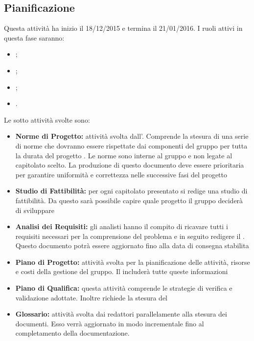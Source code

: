 \documentclass[12pt,a4paper]{article}
\begin{document}
\subsection{Pianificazione} %
Questa attività ha inizio il 18/12/2015 e termina il 21/01/2016. I ruoli attivi in questa fase saranno:
\begin{itemize}
	\item \PM;
	\item \AM;
	\item \AN;
	\item \VR.
\end{itemize}
Le sotto attività svolte sono:
\begin{itemize}
	\item \textbf{Norme di Progetto:} attività svolta dall’\AM. Comprende la stesura di una serie di norme che dovranno essere rispettate dai componenti del gruppo per tutta la durata del progetto \prjL. Le norme sono interne al gruppo e non legate al capitolato scelto. La produzione di questo documento deve essere prioritaria per garantire uniformità e correttezza nelle successive fasi del progetto
	\item \textbf{Studio di Fattibilità:} per ogni capitolato presentato si redige una studio di fattibilità. Da questo sarà possibile capire quale progetto il gruppo deciderà di sviluppare
	\item \textbf{Analisi dei Requisiti:} gli analisti hanno il compito di ricavare tutti i requisiti necessari per la comprensione del problema e in seguito redigere il \AdR. Questo documento potrà essere aggiornato fino alla data di consegna stabilita
	\item \textbf{Piano di Progetto:} attività svolta per la pianificazione delle attività, risorse e costi della gestione del gruppo. Il \PdP{} includerà tutte queste informazioni
	\item \textbf{Piano di Qualifica:} questa attività comprende le strategie di verifica e validazione adottate. Inoltre richiede la stesura del \PdQ
	\item \textbf{Glossario:} attività svolta dai redattori parallelamente alla stesura dei documenti. Esso verrà aggiornato in modo incrementale fino al completamento della documentazione.
\end{itemize}
\end{document}
